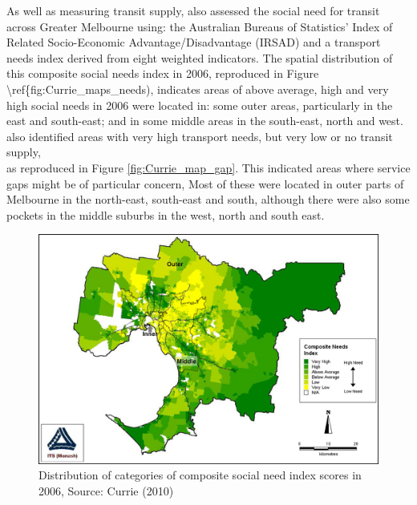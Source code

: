 \documentclass[preprint, 3p,
authoryear]{elsarticle} %
\begin{document}
As well as measuring transit supply, \citet{currie2010identifying} also
assessed the social need for transit across Greater Melbourne using: the
Australian Bureaus of Statistics' Index of Related Socio-Economic
Advantage/Disadvantage (IRSAD) and a transport needs index derived from
eight weighted indicators. The spatial distribution of this composite
social needs index in 2006, reproduced in Figure
\textbackslash ref\{fig:Currie\_maps\_needs), indicates areas of above
average, high and very high social needs in 2006 were located in: some
outer areas, particularly in the east and south-east; and in some middle
areas in the south-east, north and west. \citet{currie2010identifying}
also identified areas with very high transport needs, but very low or no
transit supply,\\
as reproduced in Figure \ref{fig:Currie_map_gap}. This indicated areas
where service gaps might be of particular concern, Most of these were
located in outer parts of Melbourne in the north-east, south-east and
south, although there were also some pockets in the middle suburbs in
the west, north and south east.

\begin{figure}
\includegraphics[width=1\linewidth]{graphics/Currie2010Needs} \caption{Distribution of categories of composite social need index scores in 2006, Source: Currie (2010)}\label{fig:Currie_map_needs}
\end{figure}
\end{document}
